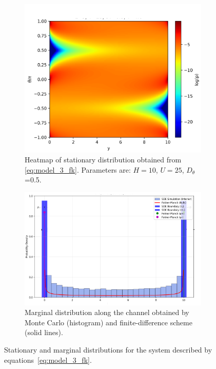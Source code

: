 \begin{figure}[htbp]
    \centering
    \begin{subfigure}[b]{0.45\textwidth}
        \centering
        \includegraphics[scale=0.2]{graphics/model_3_pdf.png}
        \caption{Heatmap of stationary distribution obtained from \eqref{eq:model_3_fk}. 
        Parameters are: $H=10$, $U=25$, $D_\theta$=0.5.}
        \label{fig:model_3_pdf}
    \end{subfigure}
    \hfill
    \begin{subfigure}[b]{0.45\textwidth}
        \centering
        \includegraphics[width=\textwidth]{graphics/model_3_hist.png}
        \caption{Marginal distribution along the channel obtained by Monte Carlo (histogram) and 
        finite-difference scheme (solid lines).}
        \label{fig:model_3_hist}
    \end{subfigure}
    \caption{Stationary and marginal distributions for the system described by equations~\eqref{eq:model_3_fk}.}
    \label{fig:model_3_results}
\end{figure}

